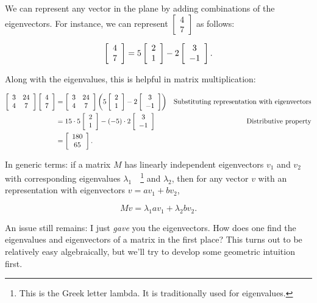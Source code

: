 \documentclass[../gatm.tex]{subfiles}
\begin{document}
We can represent any vector in the plane by adding combinations of the eigenvectors. For instance, we can represent $\left[\begin{array}{c} 4 \\ 7 \end{array}\right]$ as follows:

$$\left[\begin{array}{c} 4 \\ 7 \end{array}\right] = 5\left[\begin{array}{c} 2 \\ 1 \end{array}\right] - 2\left[\begin{array}{c} 3 \\ -1 \end{array}\right].$$

\noindent Along with the eigenvalues, this is helpful in matrix multiplication:

\begin{align*}
\left[\begin{array}{cc} 3 & 24 \\ 4 & 7 \end{array}\right]\left[\begin{array}{c} 4 \\ 7 \end{array}\right]&=\left[\begin{array}{cc} 3 & 24 \\ 4 & 7 \end{array}\right]\left(5\left[\begin{array}{c} 2 \\ 1 \end{array}\right]-2\left[\begin{array}{c} 3 \\ -1 \end{array}\right]\right) & \text{Substituting representation with eigenvectors} \\
&= 15\cdot 5 \left[\begin{array}{c} 2 \\ 1 \end{array}\right] - (-5)\cdot 2 \left[\begin{array}{c} 3 \\ -1 \end{array}\right] & \text{Distributive property} \\
&= \left[\begin{array}{c} 180 \\ 65 \end{array}\right].
\end{align*}

\noindent In generic terms: if a matrix $M$ has linearly independent eigenvectors $v_1$ and $v_2$ with corresponding eigenvalues $\lambda_1\quad$\footnote{This is the Greek letter lambda. It is traditionally used for eigenvalues.} and $\lambda_2$, then for any vector $v$ with an representation with eigenvectors $v=av_1+bv_2$,

$$Mv=\lambda_1av_1 + \lambda_2bv_2.$$

\noindent An issue still remains: I just \textit{gave} you the eigenvectors. How does one find the eigenvalues and eigenvectors of a matrix in the first place? This turns out to be relatively easy algebraically, but we'll try to develop some geometric intuition first.
\end{document}
